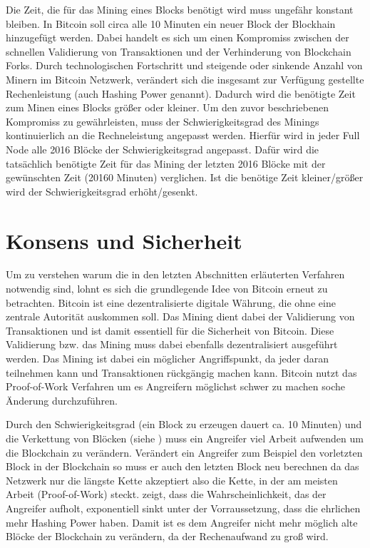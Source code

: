 \documentclass[ngerman,runningheads,a4paper]{llncs}[2018/03/10]
\begin{document}
Die Zeit, die für das Mining eines Blocks benötigt wird muss ungefähr konstant bleiben. In Bitcoin soll circa alle 10 Minuten ein neuer Block der Blockhain hinzugefügt werden. Dabei handelt es sich um einen Kompromiss zwischen der schnellen Validierung von Transaktionen und der Verhinderung von Blockchain Forks. Durch technologischen Fortschritt und steigende oder sinkende Anzahl von Minern im Bitcoin Netzwerk, verändert sich die insgesamt zur Verfügung gestellte Rechenleistung (auch Hashing Power genannt). Dadurch wird die benötigte Zeit zum Minen eines Blocks größer oder kleiner. Um den zuvor beschriebenen Kompromiss zu gewährleisten, muss der Schwierigkeitsgrad des Minings kontinuierlich an die Rechneleistung angepasst werden. Hierfür wird in jeder Full Node alle 2016 Blöcke der Schwierigkeitsgrad angepasst. Dafür wird die tatsächlich benötigte Zeit für das Mining der letzten 2016 Blöcke mit der gewünschten Zeit (20160 Minuten) verglichen. Ist die benötige Zeit kleiner/größer wird der Schwierigkeitsgrad erhöht/gesenkt.

\section{Konsens und Sicherheit}\label{sec:konsens}

Um zu verstehen warum die in den letzten Abschnitten erläuterten Verfahren notwendig sind, lohnt es sich die grundlegende Idee von Bitcoin erneut zu betrachten. Bitcoin ist eine dezentralisierte digitale Währung, die ohne eine zentrale Autorität auskommen soll. Das Mining dient dabei der Validierung von Transaktionen und ist damit essentiell für die Sicherheit von Bitcoin. Diese Validierung bzw. das Mining muss dabei ebenfalls dezentralisiert ausgeführt werden.  Das Mining ist dabei ein möglicher Angriffspunkt, da jeder daran teilnehmen kann und Transaktionen rückgängig machen kann. Bitcoin nutzt das Proof-of-Work Verfahren  um es Angreifern möglichst schwer zu machen soche Änderung durchzuführen.

Durch den Schwierigkeitsgrad (ein Block zu erzeugen dauert ca. 10 Minuten) und die Verkettung von Blöcken (siehe ) muss ein Angreifer viel Arbeit aufwenden um die Blockchain zu verändern. Verändert ein Angreifer zum Beispiel den vorletzten Block in der Blockchain so muss er auch den letzten Block neu berechnen da das Netzwerk nur die längste Kette akzeptiert also die Kette, in der am meisten Arbeit (Proof-of-Work) steckt. \citep{bitcoinPDF} zeigt, dass die Wahrscheinlichkeit, das der Angreifer aufholt, exponentiell sinkt unter der Vorraussetzung, dass die ehrlichen mehr Hashing Power haben. Damit ist es dem Angreifer nicht mehr möglich alte Blöcke der Blockchain zu verändern, da der Rechenaufwand zu groß wird.
\end{document}
